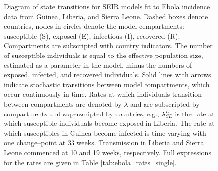\begin{figure}[htbp]
\begin{fullpage}
{
		}
		\caption[Diagram of single country SEIR models for the Ebola outbreak in West Africa.]{Diagram of state transitions for SEIR models fit to Ebola incidence data from Guinea, Liberia, and Sierra Leone. Dashed boxes denote countries, nodes in circles denote the model compartments: susceptible (S), exposed (E), infectious (I), recovered (R). Compartments  are subscripted with country indicators. The number of susceptible individuals is equal to the effective population size, estimated as a parameter in the model, minus the numbers of exposed, infected, and recovered individuals. Solid lines with arrows indicate stochastic transitions between model compartments, which occur continuously in time. Rates at which individuals transition between compartments are denoted by $ \lambda $ and are subscripted by compartments and superscripted by countries, e.g., $ \lambda_{SE}^L $ is the rate at which susceptible individuals become exposed in Liberia. The rate at which susceptibles in Guinea become infected is time varying with one change--point at 33 weeks. Transmission in Liberia and Sierra Leone commenced at 10 and 19 weeks, respectively. Full expressions for the rates are given in Table \ref{tab:ebola_rates_single}.}
		\label{fig:ebola_single_diag}
	\end{fullpage}
\end{figure}


